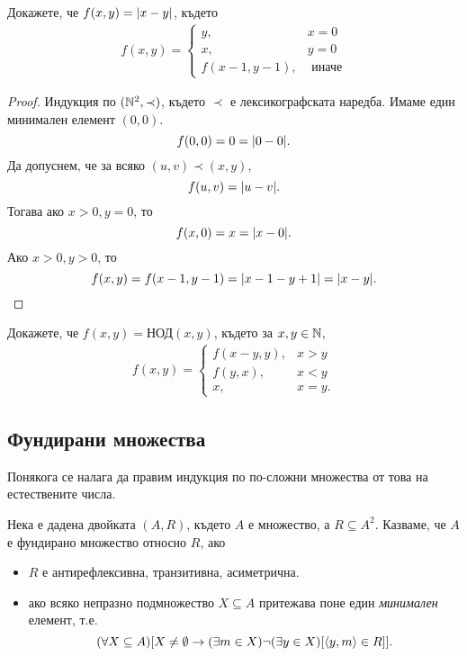 \begin{problem}
  Докажете,  че $f(x,y) = \lvert{x-y}\rvert$, където
  \begin{align*}
    f(x,y) = 
    \begin{cases}
      y, & x = 0\\
      x, & y = 0\\
      f(x-1,y-1), & \mbox{ иначе}
    \end{cases}
  \end{align*}
\end{problem}
\begin{proof}
  Индукция по $(\mathbb{N}^2,\prec)$, където $\prec$ е лексикографската наредба.
  Имаме един минимален елемент $(0,0)$.
  \[f(0,0) = 0 = \lvert{0 - 0}\rvert.\]
  Да допуснем, че за всяко $(u,v) \prec (x,y)$, 
  \[f(u,v) = \lvert{u - v}\rvert.\]
  Тогава ако $x > 0, y = 0$, то
  \[f(x,0) = x = \lvert{x - 0}\rvert.\]
  Ако $x> 0, y > 0$, то
  \[f(x,y) = f(x-1,y-1) = \lvert{x-1-y+1}\rvert =\lvert{x-y}\rvert.\]
\end{proof}

\begin{problem}
  Докажете, че $f(x,y) = \mbox{НОД}(x,y)$, където
  за $x,y \in \mathbb{N}$,
  \begin{align*}
    f(x,y) = 
    \begin{cases}
      f(x-y,y), & x > y\\
      f(y,x), & x < y\\
      x, & x = y.
    \end{cases}
  \end{align*}
\end{problem}


\newpage
\subsection*{Фундирани множества}

Понякога се налага да правим индукция по по-сложни множества от това на естествените
числа.

\begin{dfn}
  Нека е дадена двойката $(A,R)$, където $A$ е множество, а $R\subseteq A^2$.
  Казваме, че $A$ е фундирано множество относно $R$, ако 
  \begin{itemize}
  \item 
    $R$ е антирефлексивна, транзитивна, асиметрична.
  \item
    ако всяко непразно подмножество $X\subseteq A$ притежава поне един {\em минимален} елемент, т.е.
    \[(\forall X\subseteq A)[X\neq\emptyset \rightarrow (\exists m\in X)\neg(\exists y\in X)[\langle{y,m}\rangle \in R]].\]
  \end{itemize}
\end{dfn}


